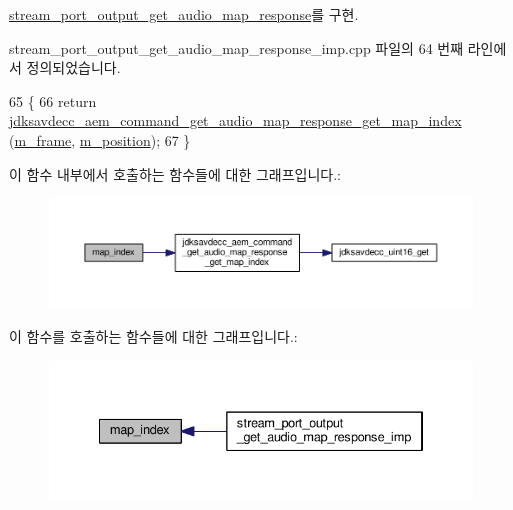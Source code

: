 \hyperlink{classavdecc__lib_1_1stream__port__output__get__audio__map__response_a95b259013c01868261bbe7e7d5768b59}{stream\+\_\+port\+\_\+output\+\_\+get\+\_\+audio\+\_\+map\+\_\+response}를 구현.



stream\+\_\+port\+\_\+output\+\_\+get\+\_\+audio\+\_\+map\+\_\+response\+\_\+imp.\+cpp 파일의 64 번째 라인에서 정의되었습니다.


\begin{DoxyCode}
65 \{
66     \textcolor{keywordflow}{return} \hyperlink{group__command__get__audio__map__response_ga64da102f201b88cea6fea5c801a1d8e5}{jdksavdecc\_aem\_command\_get\_audio\_map\_response\_get\_map\_index}
      (\hyperlink{classavdecc__lib_1_1stream__port__output__get__audio__map__response__imp_a50417969cf438e7c8d698726bbbe2ff9}{m\_frame}, \hyperlink{classavdecc__lib_1_1stream__port__output__get__audio__map__response__imp_af5e691c4a8a0feb07f48440b321206cd}{m\_position});
67 \}
\end{DoxyCode}


이 함수 내부에서 호출하는 함수들에 대한 그래프입니다.\+:
\nopagebreak
\begin{figure}[H]
\begin{center}
\leavevmode
\includegraphics[width=350pt]{classavdecc__lib_1_1stream__port__output__get__audio__map__response__imp_a2fdcf4d2f53407b6a6b165ec04b38b25_cgraph}
\end{center}
\end{figure}




이 함수를 호출하는 함수들에 대한 그래프입니다.\+:
\nopagebreak
\begin{figure}[H]
\begin{center}
\leavevmode
\includegraphics[width=334pt]{classavdecc__lib_1_1stream__port__output__get__audio__map__response__imp_a2fdcf4d2f53407b6a6b165ec04b38b25_icgraph}
\end{center}
\end{figure}


